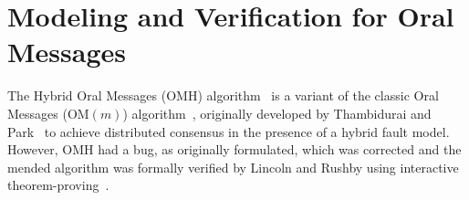 \documentclass{llncs/llncs}
\newcommand{\OM}[1]{\ensuremath{\mathrm{OM}(#1)}\xspace}
\newcommand{\OMH}{\ensuremath{\mathrm{OMH}}\xspace}
\begin{document}
% 
% 
% 
% 




\section{Modeling and Verification for Oral Messages}\label{sec:byz}

The Hybrid Oral Messages ($\OMH$) algorithm~\cite{Lincoln-Rushby} is a variant of the classic Oral Messages ($\OM{m}$) algorithm~\cite{om}, originally developed by Thambidurai and Park~\cite{hybrid} to achieve distributed consensus in the presence of a hybrid fault model. However, $\OMH$ had a bug, as originally formulated, which was corrected and the mended algorithm was formally verified by Lincoln and Rushby using interactive theorem-proving~\cite{Lincoln-Rushby}.
\end{document}
